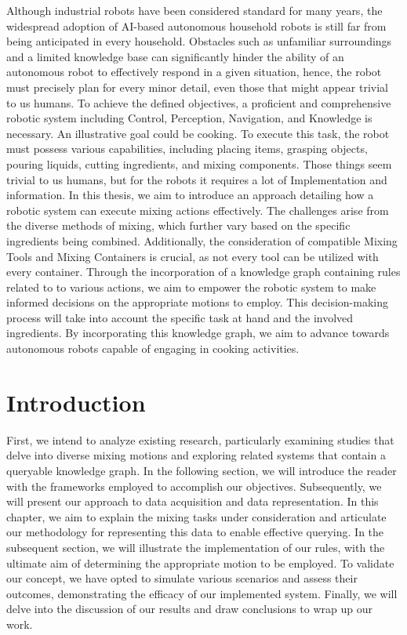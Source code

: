 \documentclass[	pdftex, 
								a4paper,
								11pt, DIV11, BCOR5mm,
								parskip,
								]{scrreprt}
\begin{document}
	Although industrial robots have been considered standard for many years, the widespread adoption of AI-based autonomous household robots is still far from being anticipated in every household.
	Obstacles such as unfamiliar surroundings and a limited knowledge base can significantly hinder the ability of an autonomous robot to effectively respond in a given situation, hence, the robot must precisely plan for every minor detail, even those that might appear trivial to us humans.
	To achieve the defined objectives, a proficient and comprehensive robotic system including Control, Perception, Navigation, and Knowledge is necessary.
	An illustrative goal could be cooking. To execute this task, the robot must possess various capabilities, including placing items, grasping objects, pouring liquids, cutting ingredients, and mixing components.	Those things seem trivial to us humans, but for the robots it requires a lot of Implementation and information.
	In this thesis, we aim to introduce an approach detailing how a robotic system can execute mixing actions effectively.	
	The challenges arise from the diverse methods of mixing, which further vary based on the specific ingredients being combined. Additionally, the consideration of compatible Mixing Tools and Mixing Containers is crucial, as not every tool can be utilized with every container.
	Through the incorporation of a knowledge graph containing rules related to to various actions, we aim to empower the robotic system to make informed decisions on the appropriate motions to employ. This decision-making process will take into account the specific task at hand and the involved ingredients.
	By incorporating this knowledge graph, we aim to advance towards autonomous robots capable of engaging in cooking activities.

	\chapter*{Introduction}
	First, we intend to analyze existing research, particularly examining studies that delve into diverse mixing motions and exploring related systems that contain a queryable knowledge graph.
	In the following section, we will introduce the reader with the frameworks employed to accomplish our objectives.	
	Subsequently, we will present our approach to data acquisition and data representation.
	In this chapter, we aim to explain the mixing tasks under consideration and articulate our methodology for representing this data to enable effective querying.
	In the subsequent section, we will illustrate the implementation of our rules, with the ultimate aim of determining the appropriate motion to be employed.
	To validate our concept, we have opted to simulate various scenarios and assess their outcomes, demonstrating the efficacy of our implemented system.
	Finally, we will delve into the discussion of our results and draw conclusions to wrap up our work.
	
\end{document}
